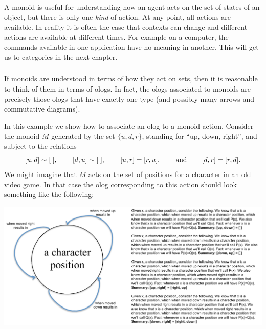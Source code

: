 \begin{applicationRUS}
\end{applicationRUS}

\begin{remarkENG}
A monoid is useful for understanding how an agent acts on the set of states of an object, but there is only one {\em kind} of action. At any point, all actions are available. In reality it is often the case that contexts can change and different actions are available at different times. For example on a computer, the commands available in one application have no meaning in another. This will get us to categories in the next chapter. 
\end{remarkENG}

\begin{remarkRUS}
\end{remarkRUS}


\subsubsection{}

\begin{blockENG}
If monoids are understood in terms of how they act on sets, then it is reasonable to think of them in terms of ologs. In fact, the ologs associated to monoids are precisely those ologs that have exactly one type (and possibly many arrows and commutative diagrams). 
\end{blockENG}

\begin{blockRUS}
\end{blockRUS}

\begin{exampleENG}\label{ex:monoid as olog}
In this example we show how to associate an olog to a monoid action. Consider the monoid $M$ generated by the set $\{u,d,r\}$, standing for “up, down, right”, and subject to the relations $$[u,d]\sim[\;],\hspace{.3in}[d,u]\sim[\;],\hspace{.3in}[u,r]=[r,u],\hspace{.3in} \textnormal{and}\hspace{.3in} [d,r]=[r,d].$$
We might imagine that $M$ acts on the set of positions for a character in an old video game. In that case the olog corresponding to this action should look something like the following:
\begin{center}
\includegraphics[width=\textwidth]{monoidOlog}
\end{center}
\end{exampleENG}

